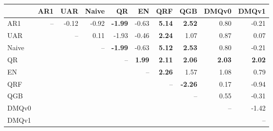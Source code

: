 \begin{tabular}{lrrrrrrrrr}
\toprule
 & AR1 & UAR & Naive & QR & EN & QRF & QGB & DMQv0 & DMQv1 \\
\midrule
AR1 & -- & -0.12 & -0.92 & \textbf{-1.99} & -0.63 & \textbf{5.14} & \textbf{2.52} & 0.80 & -0.21 \\
UAR &  & -- & 0.11 & -1.93 & -0.46 & \textbf{2.24} & 1.07 & 0.87 & 0.07 \\
Naive &  &  & -- & \textbf{-1.99} & -0.63 & \textbf{5.12} & \textbf{2.53} & 0.80 & -0.21 \\
QR &  &  &  & -- & \textbf{1.99} & \textbf{2.11} & \textbf{2.06} & \textbf{2.03} & \textbf{2.02} \\
EN &  &  &  &  & -- & \textbf{2.26} & 1.57 & 1.08 & 0.79 \\
QRF &  &  &  &  &  & -- & \textbf{-2.26} & 0.17 & -0.94 \\
QGB &  &  &  &  &  &  & -- & 0.55 & -0.31 \\
DMQv0 &  &  &  &  &  &  &  & -- & -1.42 \\
DMQv1 &  &  &  &  &  &  &  &  & -- \\
\bottomrule
\end{tabular}
